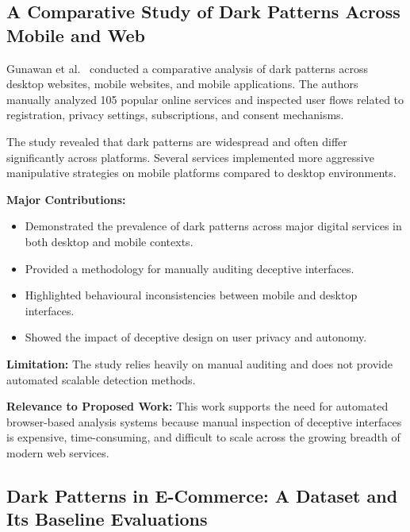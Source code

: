 
\subsection{A Comparative Study of Dark Patterns Across Mobile and Web}

Gunawan et al.~\cite{gunawan2021} conducted a comparative analysis of dark patterns across desktop websites, mobile websites, and mobile applications. The authors manually analyzed 105 popular online services and inspected user flows related to registration, privacy settings, subscriptions, and consent mechanisms.

The study revealed that dark patterns are widespread and often differ significantly across platforms. Several services implemented more aggressive manipulative strategies on mobile platforms compared to desktop environments.

\vspace{0.3cm}

\textbf{Major Contributions:}
\begin{itemize}
\item Demonstrated the prevalence of dark patterns across major digital services in both desktop and mobile contexts.
\item Provided a methodology for manually auditing deceptive interfaces.
\item Highlighted behavioural inconsistencies between mobile and desktop interfaces.
\item Showed the impact of deceptive design on user privacy and autonomy.
\end{itemize}

\vspace{0.3cm}

\textbf{Limitation:}
The study relies heavily on manual auditing and does not provide automated scalable detection methods.

\vspace{0.3cm}

\textbf{Relevance to Proposed Work:}
This work supports the need for automated browser-based analysis systems because manual inspection of deceptive interfaces is expensive, time-consuming, and difficult to scale across the growing breadth of modern web services.


\subsection{Dark Patterns in E-Commerce: A Dataset and Its Baseline Evaluations}

